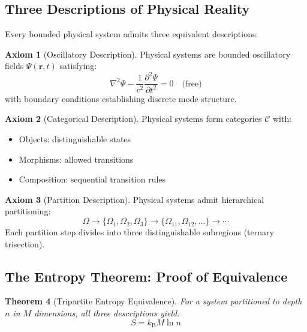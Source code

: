 \documentclass[12pt,a4paper]{article}
\newtheorem{theorem}{Theorem}[section]
\theoremstyle{definition}
\newtheorem{axiom}[theorem]{Axiom}
\theoremstyle{remark}
\newcommand{\kB}{k_{\mathrm{B}}}
\begin{document}
\subsection{Three Descriptions of Physical Reality}

Every bounded physical system admits three equivalent descriptions:

\begin{axiom}[Oscillatory Description]
\label{ax:osc}
Physical systems are bounded oscillatory fields $\Psi(\mathbf{r}, t)$ satisfying:
\begin{equation}
\nabla^2 \Psi - \frac{1}{c^2}\frac{\partial^2 \Psi}{\partial t^2} = 0 \quad \text{(free)}
\end{equation}
with boundary conditions establishing discrete mode structure.
\end{axiom}

\begin{axiom}[Categorical Description]
\label{ax:cat}
Physical systems form categories $\mathcal{C}$ with:
\begin{itemize}
    \item Objects: distinguishable states
    \item Morphisms: allowed transitions
    \item Composition: sequential transition rules
\end{itemize}
\end{axiom}

\begin{axiom}[Partition Description]
\label{ax:part}
Physical systems admit hierarchical partitioning:
\begin{equation}
\Omega \to \{\Omega_1, \Omega_2, \Omega_3\} \to \{\Omega_{11}, \Omega_{12}, \ldots\} \to \cdots
\end{equation}
Each partition step divides into three distinguishable subregions (ternary trisection).
\end{axiom}

\subsection{The Entropy Theorem: Proof of Equivalence}

\begin{theorem}[Tripartite Entropy Equivalence]
\label{thm:entropy}
For a system partitioned to depth $n$ in $M$ dimensions, all three descriptions yield:
\begin{equation}
S = \kB M \ln n
\end{equation}
\end{theorem}
\end{document}
